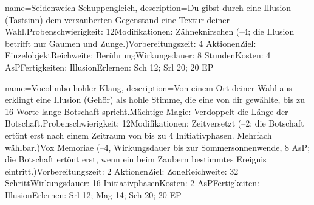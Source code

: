 {
    name={Seidenweich Schuppengleich},
    description={Du gibst durch eine Illusion (Tastsinn) dem verzauberten Gegenstand eine Textur deiner Wahl.\newline Probenschwierigkeit: 12\newline Modifikationen: Zähneknirschen (–4; die Illusion betrifft nur Gaumen und Zunge.)\newline Vorbereitungszeit: 4 Aktionen\newline Ziel: Einzelobjekt\newline Reichweite: Berührung\newline Wirkungsdauer: 8 Stunden\newline Kosten: 4 AsP\newline Fertigkeiten: Illusion\newline Erlernen: Sch 12; Srl 20; 20 EP}
}


{
    name={Vocolimbo hohler Klang},
    description={Von einem Ort deiner Wahl aus erklingt eine Illusion (Gehör) als hohle Stimme, die eine von dir gewählte, bis zu 16 Worte lange Botschaft spricht.\newline Mächtige Magie: Verdoppelt die Länge der Botschaft.\newline Probenschwierigkeit: 12\newline Modifikationen: Zeitversetzt (–2; die Botschaft ertönt erst nach einem Zeitraum von bis zu 4 Initiativphasen. Mehrfach wählbar.)\newline Vox Memoriae (–4, Wirkungsdauer bis zur Sommersonnenwende, 8 AsP; die Botschaft ertönt erst, wenn ein beim Zaubern bestimmtes Ereignis eintritt.)\newline Vorbereitungszeit: 2 Aktionen\newline Ziel: Zone\newline Reichweite: 32 Schritt\newline Wirkungsdauer: 16 Initiativphasen\newline Kosten: 2 AsP\newline Fertigkeiten: Illusion\newline Erlernen: Srl 12; Mag 14; Sch 20; 20 EP}
}


